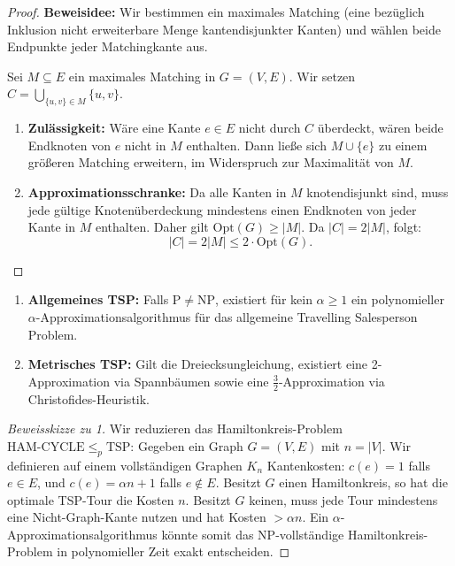\begin{proof}
    \textbf{Beweisidee:} Wir bestimmen ein maximales Matching (eine bezüglich Inklusion nicht erweiterbare Menge kantendisjunkter Kanten) und wählen beide Endpunkte jeder Matchingkante aus.
    
    Sei $M \subseteq E$ ein maximales Matching in $G=(V, E)$. Wir setzen $C = \bigcup_{\{u, v\} \in M} \{u, v\}$.
    \begin{enumerate}
        \item \textbf{Zulässigkeit:} Wäre eine Kante $e \in E$ nicht durch $C$ überdeckt, wären beide Endknoten von $e$ nicht in $M$ enthalten. Dann ließe sich $M \cup \{e\}$ zu einem größeren Matching erweitern, im Widerspruch zur Maximalität von $M$.
        \item \textbf{Approximationsschranke:} Da alle Kanten in $M$ knotendisjunkt sind, muss jede gültige Knotenüberdeckung mindestens einen Endknoten von jeder Kante in $M$ enthalten. Daher gilt $\mathrm{Opt}(G) \ge |M|$. Da $|C| = 2|M|$, folgt:
        \[
            |C| = 2|M| \le 2 \cdot \mathrm{Opt}(G).
        \]
    \end{enumerate}
\end{proof}

\begin{theorem}
    \begin{enumerate}
        \item \textbf{Allgemeines TSP:} Falls $\mathrm{P} \neq \mathrm{NP}$, existiert für kein $\alpha \ge 1$ ein polynomieller $\alpha$-Approximationsalgorithmus für das allgemeine Travelling Salesperson Problem.
        \item \textbf{Metrisches TSP:} Gilt die Dreiecksungleichung, existiert eine 2-Approximation via Spannbäumen sowie eine $\frac{3}{2}$-Approximation via Christofides-Heuristik.
    \end{enumerate}
\end{theorem}

\begin{proof}[Beweisskizze zu 1]
    Wir reduzieren das Hamiltonkreis-Problem $\mathrm{HAM\text{-}CYCLE} \le_p \mathrm{TSP}$:
    Gegeben ein Graph $G=(V, E)$ mit $n = |V|$. Wir definieren auf einem vollständigen Graphen $K_n$ Kantenkosten: $c(e) = 1$ falls $e \in E$, und $c(e) = \alpha n + 1$ falls $e \notin E$.
    Besitzt $G$ einen Hamiltonkreis, so hat die optimale TSP-Tour die Kosten $n$. Besitzt $G$ keinen, muss jede Tour mindestens eine Nicht-Graph-Kante nutzen und hat Kosten $> \alpha n$. Ein $\alpha$-Approximationsalgorithmus könnte somit das NP-vollständige Hamiltonkreis-Problem in polynomieller Zeit exakt entscheiden.
\end{proof}

